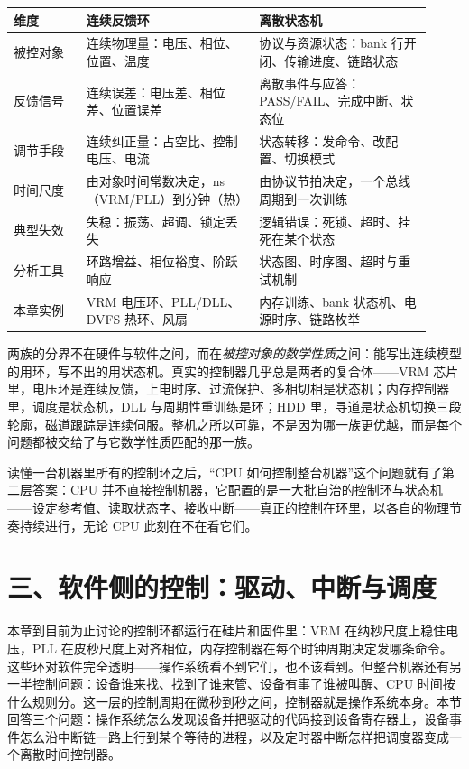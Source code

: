 \begin{longtable}{L{0.16\linewidth}L{0.38\linewidth}L{0.38\linewidth}}
\toprule
维度 & 连续反馈环 & 离散状态机 \\
\midrule
被控对象 & 连续物理量：电压、相位、位置、温度 & 协议与资源状态：bank 行开闭、传输进度、链路状态 \\\tablerowrule
反馈信号 & 连续误差：电压差、相位差、位置误差 & 离散事件与应答：PASS/FAIL、完成中断、状态位 \\\tablerowrule
调节手段 & 连续纠正量：占空比、控制电压、电流 & 状态转移：发命令、改配置、切换模式 \\\tablerowrule
时间尺度 & 由对象时间常数决定，ns（VRM/PLL）到分钟（热） & 由协议节拍决定，一个总线周期到一次训练 \\\tablerowrule
典型失效 & 失稳：振荡、超调、锁定丢失 & 逻辑错误：死锁、超时、挂死在某个状态 \\\tablerowrule
分析工具 & 环路增益、相位裕度、阶跃响应 & 状态图、时序图、超时与重试机制 \\\tablerowrule
本章实例 & VRM 电压环、PLL/DLL、DVFS 热环、风扇 & 内存训练、bank 状态机、电源时序、链路枚举 \\
\bottomrule
\end{longtable}

两族的分界不在硬件与软件之间，而在\emph{被控对象的数学性质}之间：能写出连续模型的用环，写不出的用状态机。真实的控制器几乎总是两者的复合体——VRM 芯片里，电压环是连续反馈，上电时序、过流保护、多相切相是状态机；内存控制器里，调度是状态机，DLL 与周期性重训练是环；HDD 里，寻道是状态机切换三段轮廓，磁道跟踪是连续伺服。整机之所以可靠，不是因为哪一族更优越，而是每个问题都被交给了与它数学性质匹配的那一族。

读懂一台机器里所有的控制环之后，“CPU 如何控制整台机器”这个问题就有了第二层答案：CPU 并不直接控制机器，它配置的是一大批自治的控制环与状态机——设定参考值、读取状态字、接收中断——真正的控制在环里，以各自的物理节奏持续进行，无论 CPU 此刻在不在看它们。
\section{三、软件侧的控制：驱动、中断与调度}

本章到目前为止讨论的控制环都运行在硅片和固件里：VRM 在纳秒尺度上稳住电压，PLL 在皮秒尺度上对齐相位，内存控制器在每个时钟周期决定发哪条命令。这些环对软件完全透明——操作系统看不到它们，也不该看到。但整台机器还有另一半控制问题：设备谁来找、找到了谁来管、设备有事了谁被叫醒、CPU 时间按什么规则分。这一层的控制周期在微秒到秒之间，控制器就是操作系统本身。本节回答三个问题：操作系统怎么发现设备并把驱动的代码接到设备寄存器上，设备事件怎么沿中断链一路上行到某个等待的进程，以及定时器中断怎样把调度器变成一个离散时间控制器。

